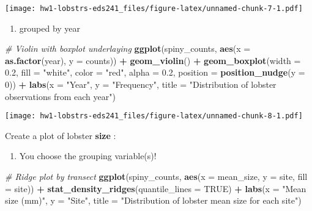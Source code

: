 \documentclass[
]{article}
\newenvironment{Shaded}{\begin{snugshade}}{\end{snugshade}}
\newcommand{\AttributeTok}[1]{\textcolor[rgb]{0.13,0.29,0.53}{#1}}
\newcommand{\CommentTok}[1]{\textcolor[rgb]{0.56,0.35,0.01}{\textit{#1}}}
\newcommand{\ConstantTok}[1]{\textcolor[rgb]{0.56,0.35,0.01}{#1}}
\newcommand{\DecValTok}[1]{\textcolor[rgb]{0.00,0.00,0.81}{#1}}
\newcommand{\FloatTok}[1]{\textcolor[rgb]{0.00,0.00,0.81}{#1}}
\newcommand{\FunctionTok}[1]{\textcolor[rgb]{0.13,0.29,0.53}{\textbf{#1}}}
\newcommand{\NormalTok}[1]{#1}
\newcommand{\SpecialCharTok}[1]{\textcolor[rgb]{0.81,0.36,0.00}{\textbf{#1}}}
\newcommand{\StringTok}[1]{\textcolor[rgb]{0.31,0.60,0.02}{#1}}
\providecommand{\tightlist}{%
  \setlength{\itemsep}{0pt}\setlength{\parskip}{0pt}}
\begin{document}
\texttt{[image: hw1-lobstrs-eds241\_files/figure-latex/unnamed-chunk-7-1.pdf]}

\begin{enumerate}
\def\labelenumi{\arabic{enumi})}
\tightlist
\item
  grouped by year
\end{enumerate}

\begin{Shaded}
\begin{Highlighting}[]
\CommentTok{\# Violin with boxplot underlaying }
\FunctionTok{ggplot}\NormalTok{(spiny\_counts, }\FunctionTok{aes}\NormalTok{(}\AttributeTok{x =} \FunctionTok{as.factor}\NormalTok{(year), }\AttributeTok{y =}\NormalTok{ counts)) }\SpecialCharTok{+}
    \FunctionTok{geom\_violin}\NormalTok{() }\SpecialCharTok{+}
    \FunctionTok{geom\_boxplot}\NormalTok{(}\AttributeTok{width =} \FloatTok{0.2}\NormalTok{, }\AttributeTok{fill =} \StringTok{"white"}\NormalTok{,}
                 \AttributeTok{color =} \StringTok{"red"}\NormalTok{, }\AttributeTok{alpha =} \FloatTok{0.2}\NormalTok{,}
                 \AttributeTok{position =} \FunctionTok{position\_nudge}\NormalTok{(}\AttributeTok{y =} \DecValTok{0}\NormalTok{)) }\SpecialCharTok{+}
    \FunctionTok{labs}\NormalTok{(}\AttributeTok{x =} \StringTok{"Year"}\NormalTok{, }\AttributeTok{y =} \StringTok{"Frequency"}\NormalTok{,}
         \AttributeTok{title =} \StringTok{"Distribution of lobster observations from each year"}\NormalTok{)}
\end{Highlighting}
\end{Shaded}

\texttt{[image: hw1-lobstrs-eds241\_files/figure-latex/unnamed-chunk-8-1.pdf]}

Create a plot of lobster \textbf{size} :

\begin{enumerate}
\def\labelenumi{\arabic{enumi})}
\setcounter{enumi}{3}
\tightlist
\item
  You choose the grouping variable(s)!
\end{enumerate}

\begin{Shaded}
\begin{Highlighting}[]
\CommentTok{\# Ridge plot by transect}
\FunctionTok{ggplot}\NormalTok{(spiny\_counts, }\FunctionTok{aes}\NormalTok{(}\AttributeTok{x =}\NormalTok{ mean\_size, }\AttributeTok{y =}\NormalTok{ site, }\AttributeTok{fill =}\NormalTok{ site)) }\SpecialCharTok{+}
    \FunctionTok{stat\_density\_ridges}\NormalTok{(}\AttributeTok{quantile\_lines =} \ConstantTok{TRUE}\NormalTok{) }\SpecialCharTok{+}
    \FunctionTok{labs}\NormalTok{(}\AttributeTok{x =} \StringTok{"Mean size (mm)"}\NormalTok{, }\AttributeTok{y =} \StringTok{"Site"}\NormalTok{,}
         \AttributeTok{title =} \StringTok{"Distribution of lobster mean size for each site"}\NormalTok{)}
\end{Highlighting}
\end{Shaded}
\end{document}
